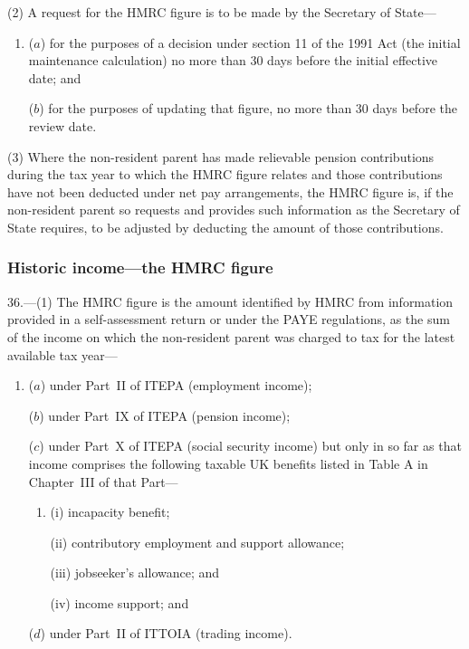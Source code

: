 \documentclass[12pt,a4paper]{article}
\begin{document}
(2) A request for the HMRC figure is to be made by the Secretary of State—
\begin{enumerate}\item[]
($a$) for the purposes of a decision under section 11 of the 1991 Act (the initial maintenance calculation) no more than 30 days before the initial effective date; and

($b$) for the purposes of updating that figure, no more than 30 days before the review date.
\end{enumerate}

(3) Where the non-resident parent has made relievable pension contributions during the tax year to which the HMRC figure relates and those contributions have not been deducted under net pay arrangements, the HMRC figure is, if the non-resident parent so requests and provides such information as the Secretary of State requires, to be adjusted by deducting the amount of those contributions.

\subsubsection[36. Historic income---the HMRC figure]{Historic income---the HMRC figure}

36.---(1)  The HMRC figure is the amount identified by HMRC from information provided in a self-assessment return or under the PAYE regulations, as the sum of the income on which the non-resident parent was charged to tax for the latest available tax year—
\begin{enumerate}\item[]
($a$) under Part~II of ITEPA (employment income);

($b$) under Part~IX of ITEPA (pension income);

($c$) under Part~X of ITEPA (social security income) but only in so far as that income comprises the following taxable UK benefits listed in Table A in Chapter~III of that Part—
\begin{enumerate}\item[]
(i) incapacity benefit;

(ii) contributory employment and support allowance;

(iii) jobseeker’s allowance; and

(iv) income support; and
\end{enumerate}

($d$) under Part~II of ITTOIA (trading income).
\end{enumerate}
\end{document}
